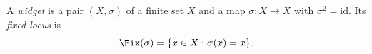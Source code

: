 \begin{definition}[Widget]\label{dm-0001}\label{def:widget}
A \emph{widget} is a pair $(X,\sigma)$ of a finite set $X$ and a map $\sigma\colon X\to X$ with $\sigma^2=\mathrm{id}$. Its \emph{fixed locus} is
\begin{equation}\label{eq:fix}
\Fix(\sigma) = \{x\in X : \sigma(x) = x\}.
\end{equation}
\end{definition}